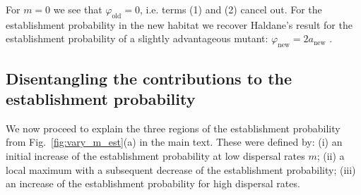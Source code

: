 \documentclass[a4paper,11pt]{scrartcl}
\newcommand{\chg}[1]{\textcolor{change}{#1}}
\begin{document}
\chg{For $m=0$ we see that $\varphi_{\text{old}}=0$, i.e. terms (1) and (2) cancel out. For the establishment probability in the new habitat we recover Haldane's result for the establishment probability of a slightly advantageous mutant: $\varphi_{\text{new}}=2a_{\text{new}}$ \citep{haldane_1927}.}

\subsection{Disentangling the contributions to the establishment probability}
\chg{We now proceed to explain} the three regions of the establishment probability from Fig.~\ref{fig:vary_m_est}(a) in the main text. These were defined by: (i) an initial increase of the establishment probability at low dispersal rates $m$; (ii) a local maximum with a subsequent decrease of the establishment probability; (iii) an increase of the establishment probability for high dispersal rates. 
\end{document}
